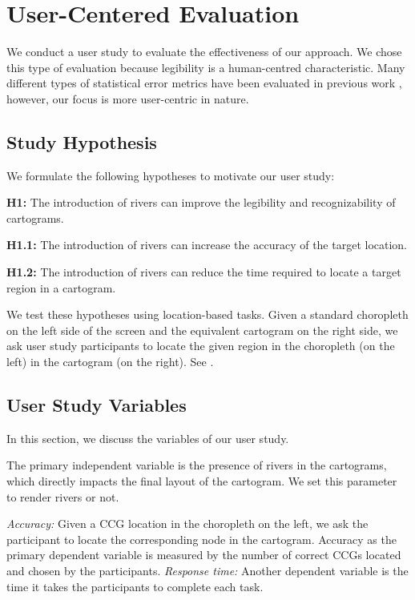 \newcommand{\pCount}{24 }
\section{User-Centered Evaluation}\label{sec:{User-Centered Evaluation}}

We conduct a user study to evaluate the effectiveness of our approach. We chose this type of evaluation because legibility is a human-centred characteristic. Many different types of statistical error metrics have been evaluated in previous work \cite{nusrat2016State}, however, our focus is more user-centric in nature.

\subsection{Study Hypothesis}\label{subsec:{Study Hypothesis}}

We formulate the following hypotheses to motivate our user study:

\textbf{H1:} The introduction of rivers can improve the legibility and recognizability of cartograms.

\textbf{H1.1:} The introduction of rivers can increase the accuracy of the target location.

\textbf{H1.2:} The introduction of rivers can reduce the time required to locate a target region in a cartogram.

We test these hypotheses using location-based tasks. Given a standard choropleth on the left side of the screen and the equivalent cartogram on the right side, we ask user study participants to locate the given region in the choropleth (on the left) in the cartogram (on the right). See .

\subsection{User Study Variables}\label{subsec:{User Study Variables}}

In this section, we discuss the variables of our user study.

The primary independent variable is the presence of rivers in the cartograms, which directly impacts the final layout of the cartogram. We set this parameter to render rivers or not.

\textit{Accuracy:} Given a CCG location in the choropleth on the left, we ask the participant to locate the corresponding node in the cartogram. Accuracy as the primary dependent variable is measured by the number of correct CCGs located and chosen by the participants. \textit{Response time:} Another dependent variable is the time it takes the participants to complete each task.

